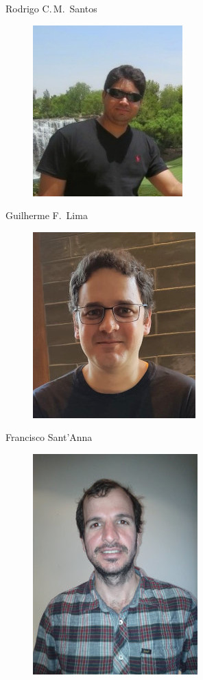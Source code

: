 \documentclass{article}
\begin{document}
\newlength{\picwidth}
\setlength{\picwidth}{2.5cm}
\begin{description}
\item[Rodrigo C.\,M.~Santos]
  \begin{center}
    \includegraphics[width=\picwidth]{pics/rodrigo.jpg}
  \end{center}
  
\item[Guilherme F.~Lima]
  \begin{center}
    \includegraphics[width=\picwidth]{pics/guilherme.jpg}
  \end{center}

\item[Francisco Sant'Anna]
  \begin{center}
    \includegraphics[width=\picwidth]{pics/francisco.jpg}
  \end{center}


\end{description}
\end{document}
